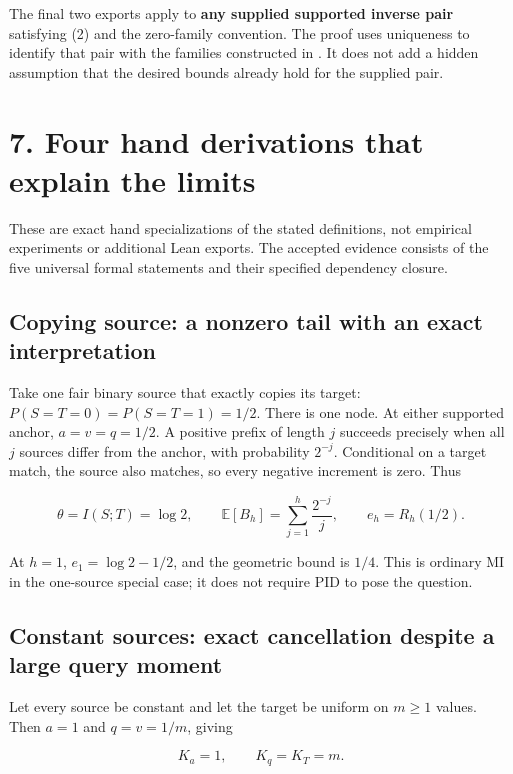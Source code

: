 \documentclass[11pt,a4paper]{article}
\let\PidSavedTexttt\texttt
\renewcommand{\texttt}[1]{\PidSavedTexttt{\seqsplit{#1}}}
\begin{document}
The final two exports apply to \textbf{any supplied supported inverse pair} satisfying (2) and the zero-family convention. The proof uses uniqueness to identify that pair with the families constructed in \texttt{actual\_finite\_bias}. It does not add a hidden assumption that the desired bounds already hold for the supplied pair.

\section{7. Four hand derivations that explain the limits}\label{four-hand-derivations-that-explain-the-limits}

These are exact hand specializations of the stated definitions, not empirical experiments or additional Lean exports. The accepted evidence consists of the five universal formal statements and their specified dependency closure.

\subsection{Copying source: a nonzero tail with an exact interpretation}\label{copying-source-a-nonzero-tail-with-an-exact-interpretation}

Take one fair binary source that exactly copies its target: \(P(S=T=0)=P(S=T=1)=1/2\). There is one node. At either supported anchor, \(a=v=q=1/2\). A positive prefix of length \(j\) succeeds precisely when all \(j\) sources differ from the anchor, with probability \(2^{-j}\). Conditional on a target match, the source also matches, so every negative increment is zero. Thus

\[
\theta=I(S;T)=\log2,\qquad
\mathbb E[B_h]=\sum_{j=1}^{h}\frac{2^{-j}}j,
\qquad e_h=R_h(1/2).
\]

At \(h=1\), \(e_1=\log2-1/2\), and the geometric bound is \(1/4\). This is ordinary MI in the one-source special case; it does not require PID to pose the question.

\subsection{Constant sources: exact cancellation despite a large query moment}\label{constant-sources-exact-cancellation-despite-a-large-query-moment}

Let every source be constant and let the target be uniform on \(m\ge1\) values. Then \(a=1\) and \(q=v=1/m\), giving

\[
K_a=1,\qquad K_q=K_T=m.
\]
\end{document}
